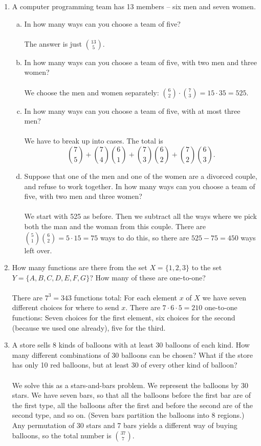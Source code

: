 \documentclass[12pt]{article}
\begin{document}
\begin{enumerate}[1.]
\item
A computer programming team has 13 members -- six men and seven women.
\begin{enumerate}[(a)]
\item
In how many ways can you choose a team of five?
\\
\\
The answer is just ${13 \choose 5}$.
\item
In how many ways can you choose a team of five, with two men and three women?
\\
\\
We choose the men and women separately: ${6 \choose 2} \cdot {7 \choose 3} = 15 \cdot 35 = 525.$

\item
In how many ways can you choose a team of five, with at most three men?
\\
\\
We have to break up into cases. The total is
$${7 \choose 5} + {7 \choose 4}{6 \choose 1} + {7 \choose 3}{6 \choose 2} + {7 \choose 2}{6 \choose 3}.$$

\item
Suppose that one of the men and one of the women are a divorced couple, and refuse to work together.
In how many ways can you choose a team of five, with two men and three women?
\\
\\
We start with 525 as before. Then we subtract all the ways where we pick both the man and the woman from this couple.
There are ${5 \choose 1} {6 \choose 2} = 5 \cdot 15 = 75$ ways to do this, so there are $525 - 75 = 450$ ways left over.

\end{enumerate}

\item
How many functions are there from the set $X = \{1, 2, 3\}$ to the set $Y = \{A, B, C, D, E, F, G\}$?
How many of these are one-to-one?
\\
\\
There are $7^3 = 343$ functions total: For each element $x$ of $X$ we have seven different choices for where to send $x$.
There are $7 \cdot 6 \cdot 5 = 210$ one-to-one functions: Seven choices for the first element, six choices for the second
(because we used one already), five for the third.
 
\item
A store sells 8 kinds of balloons with at least 30 balloons of each kind. How many different combinations
of 30 balloons can be chosen? What if the store has only 10 red balloons, but at least 30 of every other kind
of balloon?
\\
\\
We solve this as a stars-and-bars problem. We represent the balloons by 30 stars. We have seven bars, so that
all the balloons before the first bar are of the first type, all the balloons after the first and before the second are
of the second type, and so on. (Seven bars partition the balloons into 8 regions.) Any permutation of 30 stars and 7 bars
yields a different way of buying balloons, so the total number is ${37 \choose 7}$.


\end{enumerate}
\end{document}
